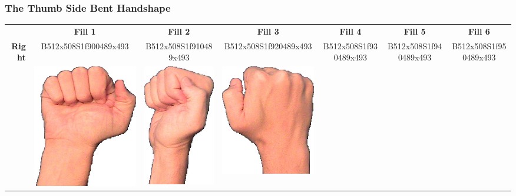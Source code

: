 \documentclass{article}
\begin{document}
\subsubsection{The Thumb Side Bent Handshape}

\begin{center}
\begin{tabular}{r*{6}{c}}
&\textbf{Fill 1}&\textbf{Fill 2}&\textbf{Fill 3}&\textbf{Fill 4}&\textbf{Fill 5}&\textbf{Fill 6}\\
\multirow{2}{*}{\textbf{Right}}&
B512x508S1f900489x493&
B512x508S1f910489x493&
B512x508S1f920489x493&
B512x508S1f930489x493&
B512x508S1f940489x493&
B512x508S1f950489x493\\
&
\includegraphics[scale=0.1]{images/10-04-1.jpg}&
\includegraphics[scale=0.1]{images/10-04-2.jpg}&
\includegraphics[scale=0.1]{images/10-04-3.jpg}&

\end{tabular}
\end{center}
\end{document}
